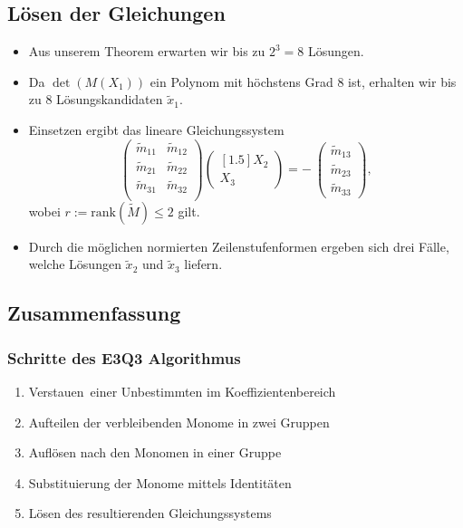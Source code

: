 \documentclass[11pt]{beamer}
\newcommand{\coloneqq}{:=}
\theoremstyle{custom}
\theoremstyle{custom}
\begin{document}
	\subsection*{Lösen der Gleichungen}
	\begin{frame}
		\begin{itemize}
			\item Aus unserem Theorem erwarten wir bis zu $2^3=8$ Lösungen.
		\pause
		\item Da $\det\left(M\left( X_{1}\right)  \right)$ ein Polynom mit höchstens Grad 8 ist, erhalten wir bis zu 8 Lösungskandidaten $\tilde{x}_1$.
		\pause
		\item Einsetzen ergibt das lineare Gleichungssystem
		\begin{equation}\label{eqn:M_lsg}
			\begin{pmatrix}
				\tilde{m}_{11} & \tilde{m}_{12}\\
				\tilde{m}_{21} & \tilde{m}_{22}\\
				\tilde{m}_{31} & \tilde{m}_{32}\\
			\end{pmatrix}
			\begin{pmatrix}[1.5]
				X_{2}\\
				X_{3}
			\end{pmatrix}
			= -\ \begin{pmatrix}
				\tilde{m}_{13}\\
				\tilde{m}_{23}\\
				\tilde{m}_{33}
			\end{pmatrix},
		\end{equation}
		wobei $r \coloneqq \text{rank}\left(\tilde{M}\right) \leq 2$ gilt.

		\item Durch die möglichen normierten Zeilenstufenformen ergeben sich drei Fälle, welche Lösungen $\tilde{x}_2$ und $\tilde{x}_3$ liefern.
				\end{itemize}
	\end{frame}
	\subsection*{Zusammenfassung}
	\begin{frame}
		\frametitle{Schritte des E3Q3 Algorithmus}
		\begin{enumerate}
			\pause
			\item \glqq Verstauen\grqq~einer Unbestimmten im Koeffizientenbereich\pause
			\item Aufteilen der verbleibenden Monome in zwei Gruppen\pause
			\item Auflösen nach den Monomen in einer Gruppe\pause
			\item Substituierung der Monome mittels Identitäten\pause
			\item Lösen des resultierenden Gleichungssystems
		\end{enumerate}
	\end{frame}
\end{document}
